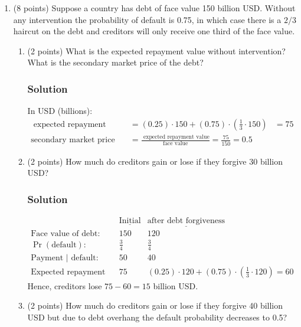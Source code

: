 \documentclass[12pt]{article}
\begin{document}
\begin{enumerate}
\begin{enumerate}
        
    \end{enumerate}

        \item (8 points) Suppose a country has debt of face value 150 billion USD. Without any intervention the probability of default is 0.75, in which case there is a $2/3$ haircut on the debt and creditors will only receive one third of the face value.

    \begin{enumerate}%
        \item (2 points) What is the expected repayment value without intervention? What is the secondary market price of the debt?
        \subsubsection*{Solution}

        In USD (billions):
        \begin{align*}
            \text{ expected repayment value} &= (0.25) \cdot 150 + (0.75) \cdot \left( \frac{1}{3} \cdot 150\right) &= 75
            \\ \text{secondary market price of the debt} &= \frac{\text{ expected repayment value}}{\text{face value}} = \frac{75}{150} = 0.5
        \end{align*}

        \item (2 points) How much do creditors gain or lose if they forgive 30 billion USD?
        \subsubsection*{Solution}

        \begin{align*}
            & \underline{\text{Initial}} & \underline{\text{after debt forgiveness}}
            \\ \text{Face value of debt: }  & 150 & 120
            \\ \Pr(\text{default}):\        & \frac{3}{4} & \frac{3}{4}
            \\ \text{Payment | default: }   & 50 & 40
            \\ \text{Expected repayment value: } & 75 &(0.25)\cdot120+(0.75)\cdot\left(\frac{1}{3}\cdot120\right)= 60
        \end{align*}
        Hence, creditors lose $75 - 60 = 15$ billion USD. 

        \item (2 points) How much do creditors gain or lose if they forgive 40 billion USD but due to debt overhang the default probability decreases to 0.5?

\end{enumerate}
\end{enumerate}
\end{document}
